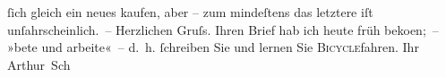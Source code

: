 \begin{ledgroupsized}[t]{13cm}
               ſich gleich ein neues kaufen, aber – zum mindeſtens das letztere {\pb}iſt unſahrscheinlich. –\pend
           \pstart
           Herzlichen Gruſs. Ihren Brief hab ich heute früh beko{\geminationm}en; – »bete und
               arbeite« – d. h. ſchreiben Sie und lernen Sie \textsc{Bicycle}fahren.\pend
           \pstart Ihr \spacefill\mbox{Arthur Sch}\pend{}\endnumbering{}\end{ledgroupsized}  \newcommand{\dateiname}{L00801}\newcommand{\titel}{Arthur Schnitzler an Richard Beer-Hofmann, 4. 6. 1898}\newcommand{\editorInnen}{Martin Anton Müller und Gerd-Hermann Susen}
      